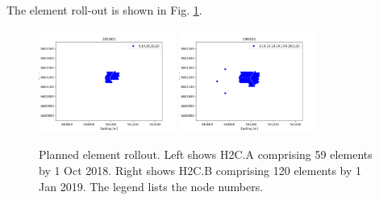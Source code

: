 \documentclass{article}
\begin{document}
The element roll-out is shown in Fig. \ref{Fig:rollout}.

\begin{figure}[H]
\includegraphics[width=0.4\textwidth]{cfg181001.png}
\includegraphics[width=0.4\textwidth]{cfg190101.png}
\caption{Planned element rollout.  Left shows H2C.A comprising 59 elements by 1 Oct 2018.  Right shows H2C.B comprising 120 elements by 1 Jan 2019.  The legend lists the node numbers.}
\label{Fig:rollout}
\end{figure}
\end{document}
